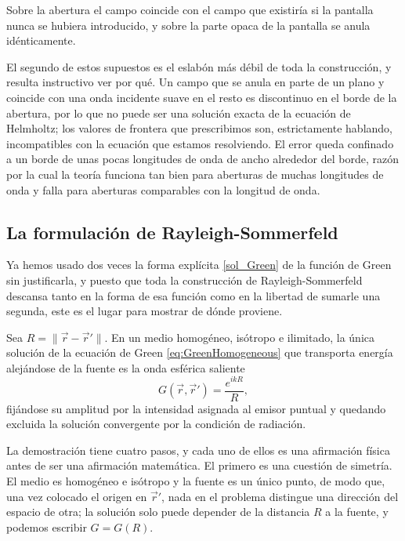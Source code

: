 	\begin{Assumption}
		Sobre la abertura el campo coincide con el campo que existiría si la pantalla nunca se hubiera introducido, y sobre la parte opaca de la pantalla se anula idénticamente.
	\end{Assumption}

	El segundo de estos supuestos es el eslabón más débil de toda la construcción, y resulta instructivo ver por qué. Un campo que se anula en parte de un plano y coincide con una onda incidente suave en el resto es discontinuo en el borde de la abertura, por lo que no puede ser una solución exacta de la ecuación de Helmholtz; los valores de frontera que prescribimos son, estrictamente hablando, incompatibles con la ecuación que estamos resolviendo. El error queda confinado a un borde de unas pocas longitudes de onda de ancho alrededor del borde, razón por la cual la teoría funciona tan bien para aberturas de muchas longitudes de onda y falla para aberturas comparables con la longitud de onda.


	\subsection{La formulación de Rayleigh-Sommerfeld}

		Ya hemos usado dos veces la forma explícita \eqref{sol_Green} de la función de Green sin justificarla, y puesto que toda la construcción de Rayleigh-Sommerfeld descansa tanto en la forma de esa función como en la libertad de sumarle una segunda, este es el lugar para mostrar de dónde proviene.

		\begin{myteo}
			Sea $R = \|\vec{r}-\vec{r}'\|$. En un medio homogéneo, isótropo e ilimitado, la única solución de la ecuación de Green \eqref{eq:GreenHomogeneous} que transporta energía alejándose de la fuente es la onda esférica saliente
			\begin{equation}\label{eq:GreenSpherical}
				G(\vec{r},\vec{r}') = \frac{e^{ikR}}{R},
			\end{equation}
			fijándose su amplitud por la intensidad asignada al emisor puntual y quedando excluida la solución convergente por la condición de radiación.
		\end{myteo}

		La demostración tiene cuatro pasos, y cada uno de ellos es una afirmación física antes de ser una afirmación matemática. El primero es una cuestión de simetría. El medio es homogéneo e isótropo y la fuente es un único punto, de modo que, una vez colocado el origen en $\vec{r}'$, nada en el problema distingue una dirección del espacio de otra; la solución solo puede depender de la distancia $R$ a la fuente, y podemos escribir $G = G(R)$.

